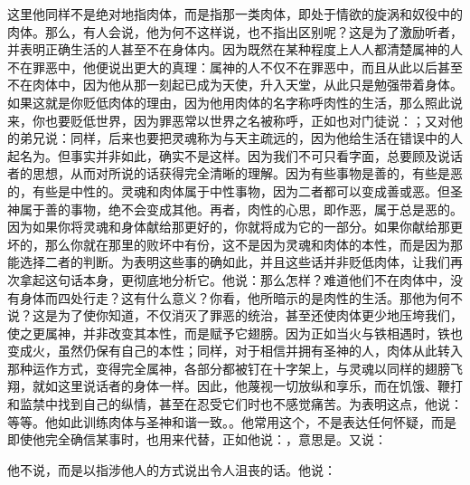 这里他同样不是绝对地指肉体，而是指那一类肉体，即处于情欲的旋涡和奴役中的肉体。那么，有人会说，他为何不这样说，也不指出区别呢？这是为了激励听者，并表明正确生活的人甚至不在身体内。因为既然在某种程度上人人都清楚属神的人不在罪恶中，他便说出更大的真理：属神的人不仅不在罪恶中，而且从此以后甚至不在肉体中，因为他从那一刻起已成为天使，升入天堂，从此只是勉强带着身体。如果这就是你贬低肉体的理由，因为他用肉体的名字称呼肉性的生活，那么照此说来，你也要贬低世界，因为罪恶常以世界之名被称呼，正如也对门徒说：；又对他的弟兄说：同样，后来也要把灵魂称为与天主疏远的，因为他给生活在错误中的人起名为。但事实并非如此，确实不是这样。因为我们不可只看字面，总要顾及说话者的思想，从而对所说的话获得完全清晰的理解。因为有些事物是善的，有些是恶的，有些是中性的。灵魂和肉体属于中性事物，因为二者都可以变成善或恶。但圣神属于善的事物，绝不会变成其他。再者，肉性的心思，即作恶，属于总是恶的。因为如果你将灵魂和身体献给那更好的，你就将成为它的一部分。如果你献给那更坏的，那么你就在那里的败坏中有份，这不是因为灵魂和肉体的本性，而是因为那能选择二者的判断。为表明这些事的确如此，并且这些话并非贬低肉体，让我们再次拿起这句话本身，更彻底地分析它。他说：那么怎样？难道他们不在肉体中，没有身体而四处行走？这有什么意义？你看，他所暗示的是肉性的生活。那他为何不说？这是为了使你知道，不仅消灭了罪恶的统治，甚至还使肉体更少地压垮我们，使之更属神，并非改变其本性，而是赋予它翅膀。因为正如当火与铁相遇时，铁也变成火，虽然仍保有自己的本性；同样，对于相信并拥有圣神的人，肉体从此转入那种运作方式，变得完全属神，各部分都被钉在十字架上，与灵魂以同样的翅膀飞翔，就如这里说话者的身体一样。因此，他蔑视一切放纵和享乐，而在饥饿、鞭打和监禁中找到自己的纵情，甚至在忍受它们时也不感觉痛苦。为表明这点，他说：等等。他如此训练肉体与圣神和谐一致。。他常用这个，不是表达任何怀疑，而是即使他完全确信某事时，也用来代替，正如他说：，意思是。又说：\par

他不说，而是以指涉他人的方式说出令人沮丧的话。他说：\par

